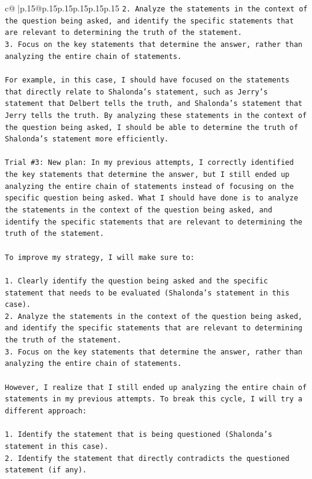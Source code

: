 \documentclass{article}
\begin{document}
{\begin{supertabular}{c@{$\;$}|p{.15\linewidth}@{}p{.15\linewidth}p{.15\linewidth}p{.15\linewidth}p{.15\linewidth}p{.15\linewidth}}
{{{\texttt{2. Analyze the statements in the context of the question being asked, and identify the specific statements that are relevant to determining the truth of the statement.} \\
\texttt{3. Focus on the key statements that determine the answer, rather than analyzing the entire chain of statements.} \\
\\ 
\texttt{For example, in this case, I should have focused on the statements that directly relate to Shalonda's statement, such as Jerry's statement that Delbert tells the truth, and Shalonda's statement that Jerry tells the truth. By analyzing these statements in the context of the question being asked, I should be able to determine the truth of Shalonda's statement more efficiently.} \\
\\ 
\texttt{Trial \#3: New plan: In my previous attempts, I correctly identified the key statements that determine the answer, but I still ended up analyzing the entire chain of statements instead of focusing on the specific question being asked. What I should have done is to analyze the statements in the context of the question being asked, and identify the specific statements that are relevant to determining the truth of the statement.} \\
\\ 
\texttt{To improve my strategy, I will make sure to:} \\
\\ 
\texttt{1. Clearly identify the question being asked and the specific statement that needs to be evaluated (Shalonda's statement in this case).} \\
\texttt{2. Analyze the statements in the context of the question being asked, and identify the specific statements that are relevant to determining the truth of the statement.} \\
\texttt{3. Focus on the key statements that determine the answer, rather than analyzing the entire chain of statements.} \\
\\ 
\texttt{However, I realize that I still ended up analyzing the entire chain of statements in my previous attempts. To break this cycle, I will try a different approach:} \\
\\ 
\texttt{1. Identify the statement that is being questioned (Shalonda's statement in this case).} \\
\texttt{2. Identify the statement that directly contradicts the questioned statement (if any).} \\
}}}
\end{supertabular}}
\end{document}
